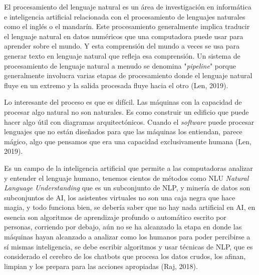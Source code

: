 \documentclass[letter, openright, 12pt]{book}
\begin{document}
El procesamiento del lenguaje natural es un área de investigación en informática e inteligencia artificial relacionada con el procesamiento de lenguajes naturales como el inglés o el mandarín. Este procesamiento generalmente implica traducir el lenguaje natural en datos numéricos que una computadora puede usar para aprender sobre el mundo. Y esta comprensión del mundo a veces se usa para generar texto en lenguaje natural que refleja esa comprensión. Un sistema de procesamiento de lenguaje natural a menudo se denomina "\textit{pipeline}" porque generalmente involucra varias etapas de procesamiento donde el lenguaje natural fluye en un extremo y la salida procesada fluye hacia el otro (Len, 2019).
\par 
Lo interesante del proceso es que es difícil. Las máquinas con la capacidad de procesar algo natural no son naturales. Es como construir un edificio que puede hacer algo útil con diagramas arquitectónicos. Cuando el \textit{software} puede procesar lenguajes que no están diseñados para que las máquinas los entiendan, parece mágico, algo que pensamos que era una capacidad exclusivamente humana (Len, 2019).
\par 
Es un campo de la inteligencia artificial que permite a las computadoras analizar y entender el lenguaje humano, tenemos cientos de métodos como NLU \textit{Natural Language Understanding} que es un subconjunto de NLP, y minería de datos son subconjuntos de AI, los asistentes virtuales no son una caja negra que hace magia, y todo funciona bien, se debería saber que no hay nada artificial en AI, en esencia son algoritmos de aprendizaje profundo o automático escrito por personas, corriendo por debajo, aún no se ha alcanzado la etapa en donde las máquinas hayan alcanzado a analizar como los humanos para poder percibirse a sí mismas inteligencia, se debe escribir algoritmos y usar técnicas de NLP, que es considerado el cerebro de los chatbots que procesa los datos crudos, los afinan, limpian y los prepara para las acciones apropiadas (Raj, 2018).
\end{document}
